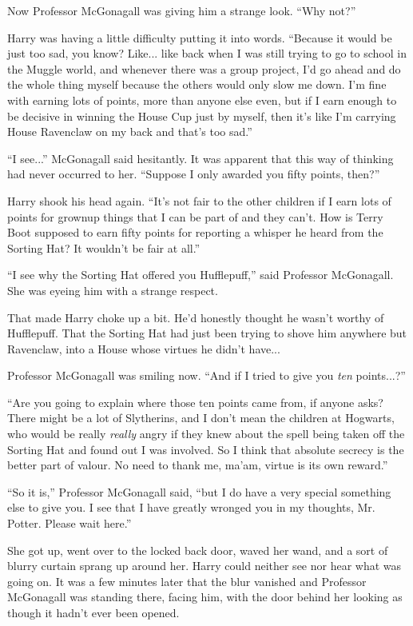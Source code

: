 Now Professor McGonagall was giving him a strange look. ``Why not?''

Harry was having a little difficulty putting it into words. ``Because it would be just too sad, you know? Like... like back when I was still trying to go to school in the Muggle world, and whenever there was a group project, I'd go ahead and do the whole thing myself because the others would only slow me down. I'm fine with earning lots of points, more than anyone else even, but if I earn enough to be decisive in winning the House Cup just by myself, then it's like I'm carrying House Ravenclaw on my back and that's too sad.''

``I see...'' McGonagall said hesitantly. It was apparent that this way of thinking had never occurred to her. ``Suppose I only awarded you fifty points, then?''

Harry shook his head again. ``It's not fair to the other children if I earn lots of points for grownup things that I can be part of and they can't. How is Terry Boot supposed to earn fifty points for reporting a whisper he heard from the Sorting Hat? It wouldn't be fair at all.''

``I see why the Sorting Hat offered you Hufflepuff,'' said Professor McGonagall. She was eyeing him with a strange respect.

That made Harry choke up a bit. He'd honestly thought he wasn't worthy of Hufflepuff. That the Sorting Hat had just been trying to shove him anywhere but Ravenclaw, into a House whose virtues he didn't have...

Professor McGonagall was smiling now. ``And if I tried to give you \emph{ten} points...?''

``Are you going to explain where those ten points came from, if anyone asks? There might be a lot of Slytherins, and I don't mean the children at Hogwarts, who would be really \emph{really} angry if they knew about the spell being taken off the Sorting Hat and found out I was involved. So I think that absolute secrecy is the better part of valour. No need to thank me, ma'am, virtue is its own reward.''

``So it is,'' Professor McGonagall said, ``but I do have a very special something else to give you. I see that I have greatly wronged you in my thoughts, Mr. Potter. Please wait here.''

She got up, went over to the locked back door, waved her wand, and a sort of blurry curtain sprang up around her. Harry could neither see nor hear what was going on. It was a few minutes later that the blur vanished and Professor McGonagall was standing there, facing him, with the door behind her looking as though it hadn't ever been opened.

